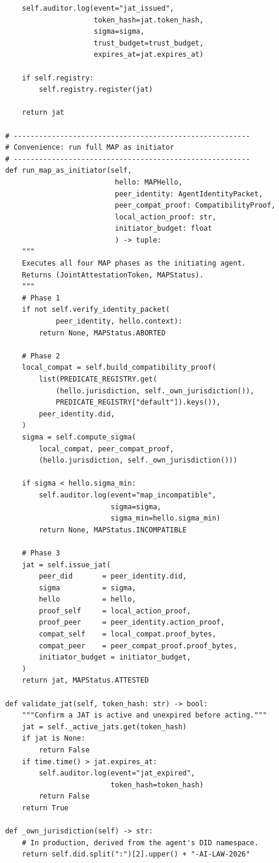 \begin{lstlisting}
        self.auditor.log(event="jat_issued",
                         token_hash=jat.token_hash,
                         sigma=sigma,
                         trust_budget=trust_budget,
                         expires_at=jat.expires_at)

        if self.registry:
            self.registry.register(jat)

        return jat

    # --------------------------------------------------------
    # Convenience: run full MAP as initiator
    # --------------------------------------------------------
    def run_map_as_initiator(self,
                              hello: MAPHello,
                              peer_identity: AgentIdentityPacket,
                              peer_compat_proof: CompatibilityProof,
                              local_action_proof: str,
                              initiator_budget: float
                              ) -> tuple:
        """
        Executes all four MAP phases as the initiating agent.
        Returns (JointAttestationToken, MAPStatus).
        """
        # Phase 1
        if not self.verify_identity_packet(
                peer_identity, hello.context):
            return None, MAPStatus.ABORTED

        # Phase 2
        local_compat = self.build_compatibility_proof(
            list(PREDICATE_REGISTRY.get(
                (hello.jurisdiction, self._own_jurisdiction()),
                PREDICATE_REGISTRY["default"]).keys()),
            peer_identity.did,
        )
        sigma = self.compute_sigma(
            local_compat, peer_compat_proof,
            (hello.jurisdiction, self._own_jurisdiction()))

        if sigma < hello.sigma_min:
            self.auditor.log(event="map_incompatible",
                             sigma=sigma,
                             sigma_min=hello.sigma_min)
            return None, MAPStatus.INCOMPATIBLE

        # Phase 3
        jat = self.issue_jat(
            peer_did       = peer_identity.did,
            sigma          = sigma,
            hello          = hello,
            proof_self     = local_action_proof,
            proof_peer     = peer_identity.action_proof,
            compat_self    = local_compat.proof_bytes,
            compat_peer    = peer_compat_proof.proof_bytes,
            initiator_budget = initiator_budget,
        )
        return jat, MAPStatus.ATTESTED

    def validate_jat(self, token_hash: str) -> bool:
        """Confirm a JAT is active and unexpired before acting."""
        jat = self._active_jats.get(token_hash)
        if jat is None:
            return False
        if time.time() > jat.expires_at:
            self.auditor.log(event="jat_expired",
                             token_hash=token_hash)
            return False
        return True

    def _own_jurisdiction(self) -> str:
        # In production, derived from the agent's DID namespace.
        return self.did.split(":")[2].upper() + "-AI-LAW-2026"
\end{lstlisting}

